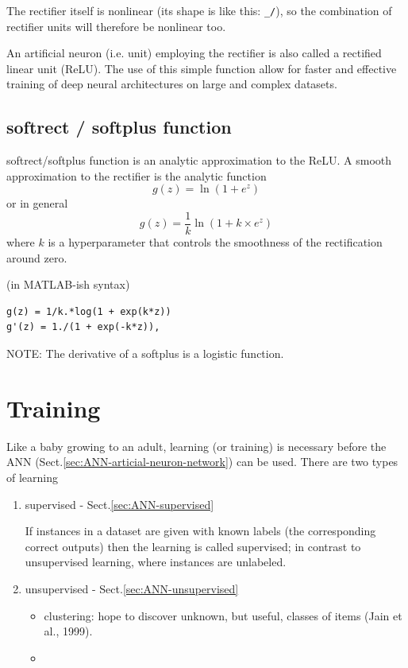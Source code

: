 The rectifier itself is nonlinear (its shape is like this: \verb!_/!), so the
combination of rectifier units will  therefore be nonlinear too.


An artificial neuron (i.e. unit) employing the rectifier is also called a
rectified linear unit (ReLU).
The use of this simple function allow for faster and effective training of deep
neural architectures on large and complex datasets.


\subsection{softrect / softplus function}
\label{sec:softrect}
\label{sec:softplus}

softrect/softplus function is an analytic approximation to the ReLU. A smooth approximation to the rectifier is the analytic
function
\begin{equation}
g(z) = \ln (1 + e^z)
\end{equation}
or in general
\begin{equation}
g(z) = \frac{1}{k} \ln (1 + k \times e^z)
\end{equation}
where $k$ is a hyperparameter that controls the smoothness of the rectification
around zero.

(in MATLAB-ish syntax)
\begin{verbatim}
g(z) = 1/k.*log(1 + exp(k*z))
g'(z) = 1./(1 + exp(-k*z)),
\end{verbatim}

NOTE:  The derivative of a softplus is a logistic function.





\section{Training}
\label{sec:train-ANN}

Like a baby growing to an adult, learning (or training) is necessary before the
ANN (Sect.\ref{sec:ANN-articial-neuron-network}) can be used. There are two
types of learning
\begin{enumerate}
  \item supervised - Sect.\ref{sec:ANN-supervised}
   
If instances in a dataset are given with known labels (the corresponding correct
outputs) then the learning is called supervised; in contrast to unsupervised
learning, where instances are unlabeled.

   
  \item unsupervised - Sect.\ref{sec:ANN-unsupervised}
 \begin{itemize}
   \item clustering: hope to discover unknown, but useful, classes of items
   (Jain et al., 1999).

   \item 
 \end{itemize}
\end{enumerate}

